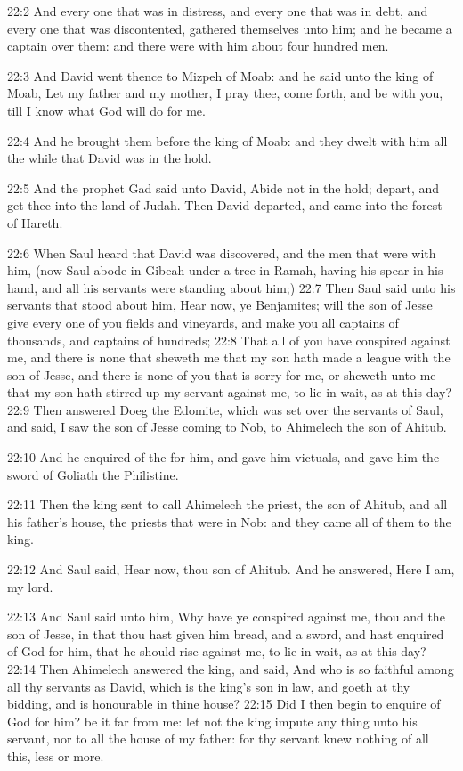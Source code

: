 22:2 And every one that was in distress, and every one that was in debt, and every one that was discontented, gathered themselves unto him; and he became a captain over them: and there were with him about four hundred men.

22:3 And David went thence to Mizpeh of Moab: and he said unto the king of Moab, Let my father and my mother, I pray thee, come forth, and be with you, till I know what God will do for me.

22:4 And he brought them before the king of Moab: and they dwelt with him all the while that David was in the hold.

22:5 And the prophet Gad said unto David, Abide not in the hold; depart, and get thee into the land of Judah. Then David departed, and came into the forest of Hareth.

22:6 When Saul heard that David was discovered, and the men that were with him, (now Saul abode in Gibeah under a tree in Ramah, having his spear in his hand, and all his servants were standing about him;) 22:7 Then Saul said unto his servants that stood about him, Hear now, ye Benjamites; will the son of Jesse give every one of you fields and vineyards, and make you all captains of thousands, and captains of hundreds; 22:8 That all of you have conspired against me, and there is none that sheweth me that my son hath made a league with the son of Jesse, and there is none of you that is sorry for me, or sheweth unto me that my son hath stirred up my servant against me, to lie in wait, as at this day?  22:9 Then answered Doeg the Edomite, which was set over the servants of Saul, and said, I saw the son of Jesse coming to Nob, to Ahimelech the son of Ahitub.

22:10 And he enquired of the \LORD for him, and gave him victuals, and gave him the sword of Goliath the Philistine.

22:11 Then the king sent to call Ahimelech the priest, the son of Ahitub, and all his father's house, the priests that were in Nob: and they came all of them to the king.

22:12 And Saul said, Hear now, thou son of Ahitub. And he answered, Here I am, my lord.

22:13 And Saul said unto him, Why have ye conspired against me, thou and the son of Jesse, in that thou hast given him bread, and a sword, and hast enquired of God for him, that he should rise against me, to lie in wait, as at this day?  22:14 Then Ahimelech answered the king, and said, And who is so faithful among all thy servants as David, which is the king's son in law, and goeth at thy bidding, and is honourable in thine house?  22:15 Did I then begin to enquire of God for him? be it far from me: let not the king impute any thing unto his servant, nor to all the house of my father: for thy servant knew nothing of all this, less or more.

